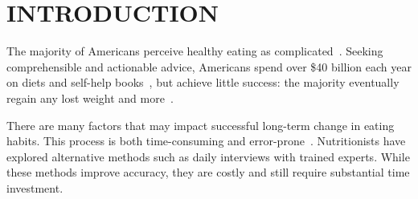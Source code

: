 \section{INTRODUCTION}

The majority of Americans perceive
healthy eating as complicated~\cite{dinkins2000beliefs}.  Seeking
comprehensible and actionable advice, Americans spend over \$40
billion each year on diets and self-help
books~\cite{reisner08:diet},
but achieve little
success: the majority eventually regain any lost weight and
more~\cite{mann2007medicare}.


There are many factors that may impact successful long-term change in
eating habits.    This process is both
time-consuming and
error-prone~\cite{pikholz2004under,goris2000undereating}.
Nutritionists have explored alternative methods such as daily
interviews with trained experts. While these methods improve accuracy,
they are costly and still require substantial time investment.



